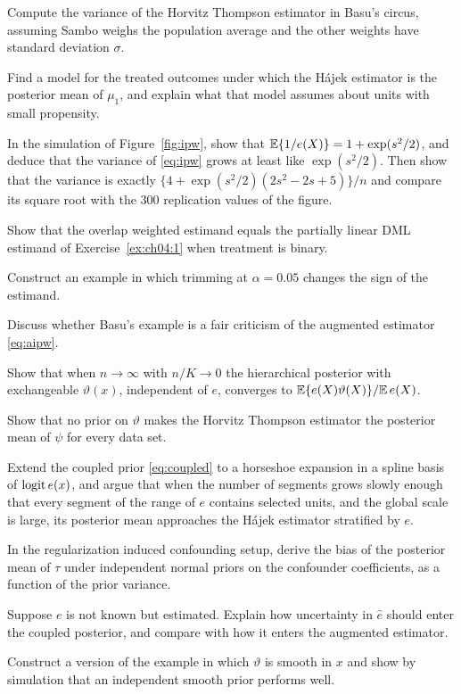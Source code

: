 \begin{exercises}
\item\label{ex:ch05:1} Compute the variance of the Horvitz Thompson estimator in Basu's circus, assuming Sambo weighs the population average and the other weights have standard deviation $\sigma$.
\item\label{ex:ch05:2} Find a model for the treated outcomes under which the H\'ajek estimator is the posterior mean of $\mu_1$, and explain what that model assumes about units with small propensity.
\item\label{ex:ch05:3} In the simulation of Figure~\ref{fig:ipw}, show that $\mathbb{E}\{1/e(X)\} = 1 + \exp(s^2/2)$, and deduce that the variance of \eqref{eq:ipw} grows at least like $\exp(s^2/2)$. Then show that the variance is exactly $\{4 + \exp(s^2/2)(2s^2 - 2s + 5)\}/n$ and compare its square root with the 300 replication values of the figure.
\item\label{ex:ch05:4} Show that the overlap weighted estimand equals the partially linear DML estimand of Exercise~\ref{ex:ch04:1} when treatment is binary.
\item\label{ex:ch05:5} Construct an example in which trimming at $\alpha = 0.05$ changes the sign of the estimand.
\item\label{ex:ch05:6} Discuss whether Basu's example is a fair criticism of the augmented estimator \eqref{eq:aipw}.

\item\label{ex:ch06:1} Show that when $n \to \infty$ with $n/K \to 0$ the hierarchical posterior with exchangeable $\vartheta(x)$, independent of $e$, converges to $\mathbb{E}\{e(X)\vartheta(X)\}/\mathbb{E}\,e(X)$.
\item\label{ex:ch06:2} Show that no prior on $\vartheta$ makes the Horvitz Thompson estimator the posterior mean of $\psi$ for every data set.
\item\label{ex:ch06:3} Extend the coupled prior \eqref{eq:coupled} to a horseshoe expansion in a spline basis of $\operatorname{logit} e(x)$, and argue that when the number of segments grows slowly enough that every segment of the range of $e$ contains selected units, and the global scale is large, its posterior mean approaches the H\'ajek estimator stratified by $e$.
\item\label{ex:ch06:4} In the regularization induced confounding setup, derive the bias of the posterior mean of $\tau$ under independent normal priors on the confounder coefficients, as a function of the prior variance.
\item\label{ex:ch06:5} Suppose $e$ is not known but estimated. Explain how uncertainty in $\hat e$ should enter the coupled posterior, and compare with how it enters the augmented estimator.
\item\label{ex:ch06:6} Construct a version of the example in which $\vartheta$ is smooth in $x$ and show by simulation that an independent smooth prior performs well.


\end{exercises}

